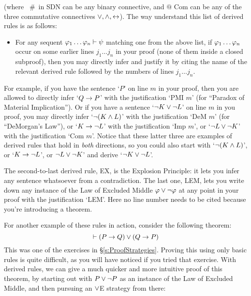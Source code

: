 \noindent (where  \ \#\  in SDN can be any binary connective, and $@$ Com can be any of the three commutative connectives $\vee, \wedge, \leftrightarrow$).  The way understand this list of derived rules is as follows:

\begin{itemize}
\item For any sequent $\mathcal{\varphi}_1 \ldots \mathcal{\varphi}_n \vdash \mathcal{\psi}$ matching one from the above list, if $\mathcal{\varphi}_1 \ldots \mathcal{\varphi}_n$ occur on some earlier lines $j_1 \ldots j_n$ in your proof (none of them inside a closed subproof), then you may directly infer \meta{\psi} and justify it by citing the name of the relevant derived rule followed by the numbers of lines $j_1 \ldots j_n$.
\end{itemize}
For example, if you have the sentence `$P$' on line $m$ in your proof, then you are allowed to directly infer `$Q \rightarrow P$' with the justification `PMI $m$' (for ``Paradox of Material Implication'').   Or if you have a sentence `$\neg K \vee \neg L$' on  line $m$ in you proof, you may directly infer `$\neg(K \wedge L)$' with the justification `DeM $m$' (for ``DeMorgan's Law''), or `$K \rightarrow \neg L$' with the justification `Imp $m$', or `$\neg L \vee \neg K$' with the justification `Com $m$'.  Notice that these latter three are examples of derived rules that hold in \emph{both} directions, so you could also start with `$\neg(K \wedge L)$', or `$K \rightarrow \neg L$', or $\neg L \vee \neg K$' and derive `$\neg K \vee \neg L$'.

The second-to-last derived rule, EX, is the Explosion Principle: it lets you infer any sentence whatsoever from a contradiction.  The last one, LEM, lets you write down any instance of the Law of Excluded Middle $\mathcal{\varphi} \vee \neg \mathcal{\varphi}$ at any point in your proof with the justification `LEM'.   Here no line number needs to be cited because you're introducing a theorem.

For another example of these rules in action, consider the following theorem:
$$\vdash (P \rightarrow Q) \vee (Q \rightarrow P)$$
This was one of the exercises in \S\ref{s:ProofStrategies}.  Proving this using only basic rules is quite difficult, as you will have noticed if you tried that exercise.  With derived rules, we can give a much quicker and more intuitive proof of this theorem, by starting out with $P \vee \neg P$ as an instance of the Law of Excluded Middle, and then pursuing an $\vee$E strategy from there:\\



